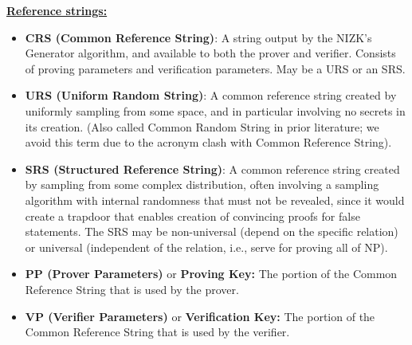 \textbf{\underline{Reference strings:}}
\begin{itemize}[leftmargin=1em]
    \item \textbf{CRS (Common Reference String)}: A string output by the NIZK’s Generator algorithm, and available to both the prover and verifier. Consists of proving parameters and verification parameters. May be a URS or an SRS.
    \item \textbf{URS (Uniform Random String)}: A common reference string created by uniformly sampling from some space, and in particular involving no secrets in its creation. (Also called Common Random String in prior literature; we avoid this term due to the acronym clash with Common Reference String).
    \item \textbf{SRS (Structured Reference String)}: A common reference string created by sampling from some complex distribution, often involving a sampling algorithm with internal randomness that must not be revealed, since it would create a trapdoor that enables creation of convincing proofs for false statements. The SRS may be non-universal (depend on the specific relation) or universal (independent of the relation, i.e., serve for proving all of NP).
    \item \textbf{PP (Prover Parameters)} or \textbf{Proving Key:} The portion of the Common Reference String that is used by the prover.
    \item \textbf{VP (Verifier  Parameters)} or \textbf{Verification Key:} The portion of the Common Reference String that is used by the verifier.
\end{itemize}
